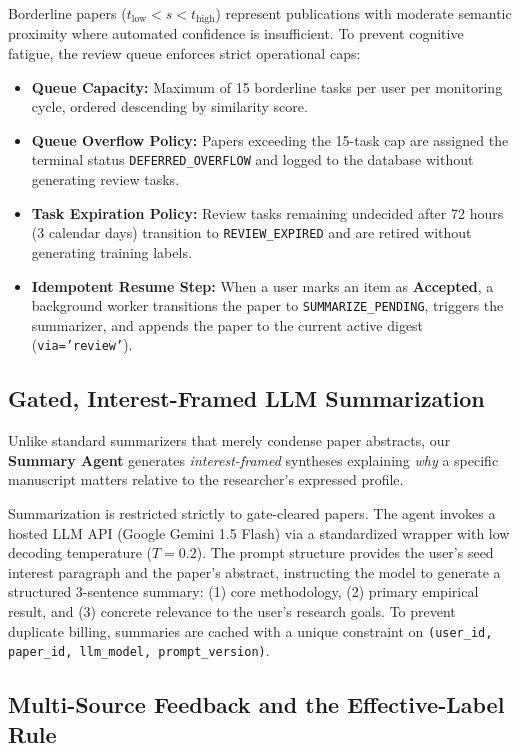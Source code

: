 Borderline papers ($t_{\text{low}} < s < t_{\text{high}}$) represent publications with moderate semantic proximity where automated confidence is insufficient. To prevent cognitive fatigue, the review queue enforces strict operational caps:
\begin{itemize}
    \item \textbf{Queue Capacity:} Maximum of 15 borderline tasks per user per monitoring cycle, ordered descending by similarity score.
    \item \textbf{Queue Overflow Policy:} Papers exceeding the 15-task cap are assigned the terminal status \texttt{DEFERRED\_OVERFLOW} and logged to the database without generating review tasks.
    \item \textbf{Task Expiration Policy:} Review tasks remaining undecided after 72 hours (3 calendar days) transition to \texttt{REVIEW\_EXPIRED} and are retired without generating training labels.
    \item \textbf{Idempotent Resume Step:} When a user marks an item as \textbf{Accepted}, a background worker transitions the paper to \texttt{SUMMARIZE\_PENDING}, triggers the summarizer, and appends the paper to the current active digest (\texttt{via='review'}).
\end{itemize}

\subsection{Gated, Interest-Framed LLM Summarization}
\label{sec:summarization}

Unlike standard summarizers that merely condense paper abstracts, our \textbf{Summary Agent} generates \textit{interest-framed} syntheses explaining \textit{why} a specific manuscript matters relative to the researcher's expressed profile.

Summarization is restricted strictly to gate-cleared papers. The agent invokes a hosted LLM API (Google Gemini 1.5 Flash) via a standardized wrapper with low decoding temperature ($T = 0.2$). The prompt structure provides the user's seed interest paragraph and the paper's abstract, instructing the model to generate a structured 3-sentence summary: (1) core methodology, (2) primary empirical result, and (3) concrete relevance to the user's research goals. To prevent duplicate billing, summaries are cached with a unique constraint on \texttt{(user\_id, paper\_id, llm\_model, prompt\_version)}.

\subsection{Multi-Source Feedback and the Effective-Label Rule}
\label{sec:feedback_labels}


